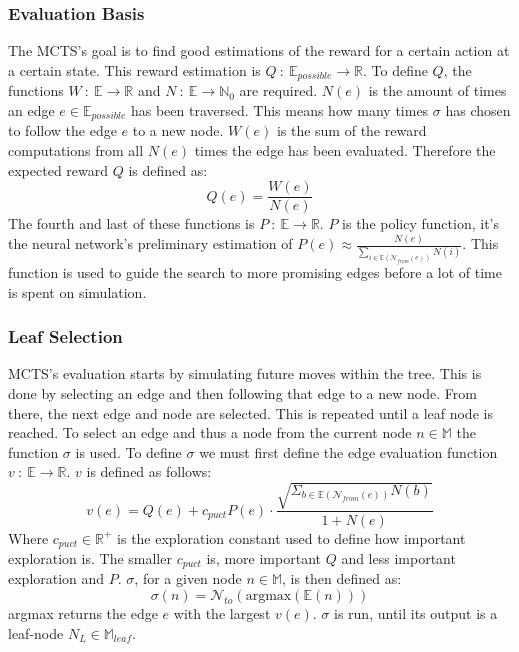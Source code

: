 \documentclass[12pt]{article}
\begin{document}
\subsubsection{Evaluation Basis}
The MCTS's goal is to find good estimations of the reward for a certain action at a certain state. This reward estimation is \(Q~:~\mathbb{E}_{possible}\to \mathbb{R}\). To define \(Q\), the functions \(W~:~\mathbb{E}\to\mathbb{R}\) and \(N~:~\mathbb{E}\to\mathbb{N}_0\) are required. \(N(e)\) is the amount of times an edge \(e\in\mathbb{E}_{possible}\) has been traversed. This means how many times \(\sigma\) has chosen to follow the edge \(e\) to a new node. \(W(e)\) is the sum of the reward computations from all \(N(e)\) times the edge has been evaluated. Therefore the expected reward \(Q\) is defined as:
\begin{equation}
Q(e) = \frac{W(e)}{N(e)}
\end{equation}
The fourth and last of these functions is \(P~:~\mathbb{E}\to\mathbb{R}\). \(P\) is the policy function, it's the neural network's preliminary estimation of \(P(e) \approx \frac{N(e)}{\sum_{i\in\mathbb{E}(\mathcal{N}_{from}(e))}N(i)}\). This function is used to guide the search to more promising edges before a lot of time is spent on simulation.

\subsubsection{Leaf Selection} \label{sec:Methods:MCTS:Leaf_selection}
MCTS's evaluation starts by simulating future moves within the tree. This is done by selecting an edge and then following that edge to a new node. From there, the next edge and node are selected. This is repeated until a leaf node is reached. To select an edge and thus a node from the current node \(n\in \mathbb{M}\) the function \(\sigma\) is used. To define \(\sigma\) we must first define the edge evaluation function \(v~:~\mathbb{E}\to\mathbb{R}\). \(v\) is defined as follows:
\begin{equation}
v(e) = Q(e) + c_{puct}P(e)\cdot\frac{\sqrt{\Sigma_{b\in\mathbb{E}(\mathcal{N}_{from}(e))}N(b)}}{1+N(e)}
\end{equation}
Where \(c_{puct}\in \mathbb{R}^+\) is the exploration constant used to define how important exploration is. The smaller \(c_{puct}\) is, more important \(Q\) and less important exploration and \(P\). \(\sigma\), for a given node \(n\in\mathbb{M}\), is then defined as:
\begin{equation}
\sigma(n) = \mathcal{N}_{to}(\text{argmax}(\mathbb{E}(n)))
\end{equation}
argmax returns the edge \(e\) with the largest \(v(e)\).
\(\sigma\) is run, until its output is a leaf-node \(N_L\in\mathbb{M}_{leaf}\).
\end{document}
